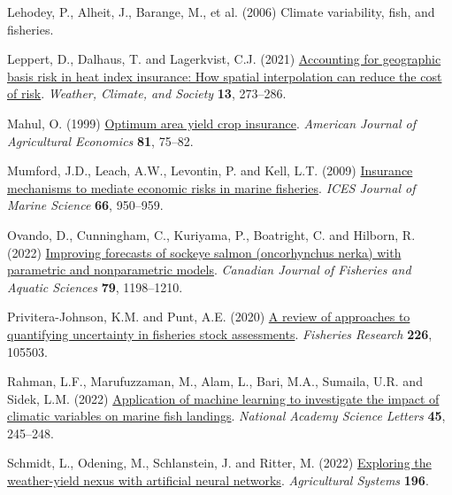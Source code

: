 \documentclass[
  letterpaper,
  DIV=11,
  numbers=noendperiod]{scrartcl}
\newlength{\cslhangindent}
\newlength{\cslentryspacingunit} %
\newenvironment{CSLReferences}[2] %
 {%
  \setlength{\parindent}{0pt}
  \ifodd #1
  \let\oldpar\par
  \def\par{\hangindent=\cslhangindent\oldpar}
  \fi
  \setlength{\parskip}{#2\cslentryspacingunit}
 }%
 {}
\begin{document}
\begin{CSLReferences}{1}{0}
\leavevmode{}%
Lehodey, P., Alheit, J., Barange, M., et al. (2006) Climate variability,
fish, and fisheries.

\leavevmode{}%
Leppert, D., Dalhaus, T. and Lagerkvist, C.J. (2021)
\href{https://doi.org/10.1175/WCAS-D-20-0070.1}{Accounting for
geographic basis risk in heat index insurance: How spatial interpolation
can reduce the cost of risk}. \emph{Weather, Climate, and Society}
\textbf{13}, 273--286.

\leavevmode{}%
Mahul, O. (1999) \href{https://doi.org/10.2307/1244451}{Optimum area
yield crop insurance}. \emph{American Journal of Agricultural Economics}
\textbf{81}, 75--82.

\leavevmode{}%
Mumford, J.D., Leach, A.W., Levontin, P. and Kell, L.T. (2009)
\href{https://doi.org/10.1093/icesjms/fsp100}{Insurance mechanisms to
mediate economic risks in marine fisheries}. \emph{ICES Journal of
Marine Science} \textbf{66}, 950--959.

\leavevmode{}%
Ovando, D., Cunningham, C., Kuriyama, P., Boatright, C. and Hilborn, R.
(2022) \href{https://doi.org/10.1139/cjfas-2021-0287}{Improving
forecasts of sockeye salmon (oncorhynchus nerka) with parametric and
nonparametric models}. \emph{Canadian Journal of Fisheries and Aquatic
Sciences} \textbf{79}, 1198--1210.

\leavevmode{}%
Privitera-Johnson, K.M. and Punt, A.E. (2020)
\href{https://doi.org/10.1016/j.fishres.2020.105503}{A review of
approaches to quantifying uncertainty in fisheries stock assessments}.
\emph{Fisheries Research} \textbf{226}, 105503.

\leavevmode{}%
Rahman, L.F., Marufuzzaman, M., Alam, L., Bari, M.A., Sumaila, U.R. and
Sidek, L.M. (2022)
\href{https://doi.org/10.1007/s40009-022-01110-0}{Application of machine
learning to investigate the impact of climatic variables on marine fish
landings}. \emph{National Academy Science Letters} \textbf{45},
245--248.

\leavevmode{}%
Schmidt, L., Odening, M., Schlanstein, J. and Ritter, M. (2022)
\href{https://doi.org/10.1016/J.AGSY.2021.103345}{Exploring the
weather-yield nexus with artificial neural networks}. \emph{Agricultural
Systems} \textbf{196}.


\end{CSLReferences}
\end{document}
